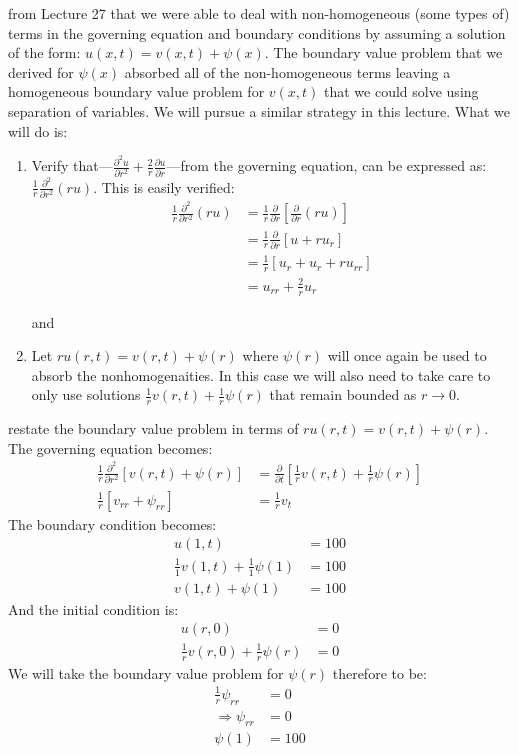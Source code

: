  from Lecture 27 that we were able to deal with non-homogeneous (some types of) terms in the governing equation and boundary conditions by assuming a solution of the form: $u(x,t) = v(x,t) + \psi(x)$.  The boundary value problem that we derived for $\psi(x)$ absorbed all of the non-homogeneous terms leaving a homogeneous boundary value problem for $v(x,t)$ that we could solve using separation of variables.  We will pursue a similar strategy in this lecture. What we will do is:

\begin{enumerate}
\item Verify that---$\frac{\partial^2 u}{\partial r^2} + \frac{2}{r}\frac{\partial u}{\partial r}$---from the governing equation, can be expressed as: $\frac{1}{r}\frac{\partial^2}{\partial r^2}(ru)$.  This is easily verified:
\begin{align*}
\frac{1}{r}\frac{\partial^2}{\partial r^2}(ru) &= \frac{1}{r}\frac{\partial}{\partial r}\left[\frac{\partial}{\partial r}(ru)\right] \\
&= \frac{1}{r}\frac{\partial}{\partial r}\left[u + ru_r\right] \\
&= \frac{1}{r}\left[u_r + u_r + ru_{rr}\right] \\
&= u_{rr} + \frac{2}{r}u_r
\end{align*}

and

\item Let $ru(r,t) = v(r,t) + \psi(r)$ where $\psi(r)$ will once again be used to absorb the nonhomogenaities.  In this case we will also need to take care to only use solutions $\frac{1}{r}v(r,t)+\frac{1}{r}\psi(r)$ that remain bounded as $r \to 0$.
\end{enumerate}

 restate the boundary value problem in terms of $ru(r,t)=v(r,t)+\psi(r)$. The governing equation becomes:
\begin{align*}
\frac{1}{r}\frac{\partial^2}{\partial r^2}\left[v(r,t) + \psi(r)\right] &= \frac{\partial}{\partial t}\left[\frac{1}{r}v(r,t) + \frac{1}{r}\psi(r)\right] \\
\frac{1}{r}\left[v_{rr} + \psi_{rr}\right] &= \frac{1}{r}v_t
\end{align*}
The boundary condition becomes:
\begin{align*}
u(1,t) &= 100 \\
\frac{1}{1}v(1,t) + \frac{1}{1}\psi(1) &= 100 \\
v(1,t) + \psi(1) &= 100
\end{align*} And the initial condition is:
\begin{align*}
u(r,0) &= 0 \\
\frac{1}{r}v(r,0) + \frac{1}{r}\psi(r) &= 0
\end{align*}
We will take the boundary value problem for $\psi(r)$ therefore to be:
\begin{align*}
\frac{1}{r}\psi_{rr} &= 0 \\
\Rightarrow \psi_{rr}&= 0 \\
\psi(1) &= 100
\end{align*}

